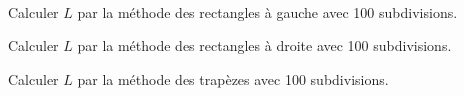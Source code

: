 \exer{[INT-004]}
\setcounter{numques}{0}~\\

\question{} Calculer $L$ par la méthode des rectangles à gauche avec 100 subdivisions.

\question{} Calculer $L$ par la méthode des rectangles à droite avec 100 subdivisions.

\question{} Calculer $L$ par la méthode des trapèzes avec 100 subdivisions.